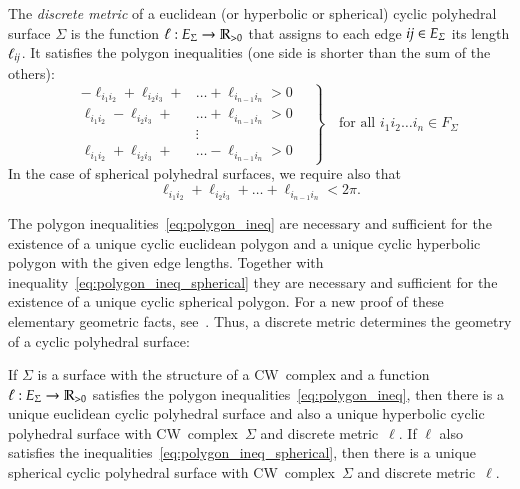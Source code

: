 \documentclass[Thesis]{subfiles}
\begin{document}
The \emph{discrete metric} of a euclidean (or hyperbolic or spherical) cyclic polyhedral surface $\Sigma$ is the function $\ell:E_{\Sigma}\rightarrow\mathbb R_{>0}$ that assigns to each edge $\it ij \in E_{\Sigma}$ its
length $\ell_{\it ij}$. 
It satisfies the polygon inequalities (one side is shorter than the sum of the others):
\begin{equation}
\label{eq:polygon_ineq}
\left.
\quad
\begin{aligned}
-\ell_{i_{1}i_{2}}+\ell_{i_{2}i_{3}}+&\ldots+\ell_{i_{n-1}i_{n}}
>0\\
\ell_{i_{1}i_{2}}-\ell_{i_{2}i_{3}}+&\ldots+\ell_{i_{n-1}i_{n}}
>0\\
&\vdots\\
\ell_{i_{1}i_{2}}+\ell_{i_{2}i_{3}}+&\ldots-\ell_{i_{n-1}i_{n}}
>0
\end{aligned}
\quad
\right\}
\quad
\text{for all $i_{1}i_{2}\ldots i_{n}\in F_{\Sigma}$}
\end{equation}
In the case of spherical polyhedral surfaces, we require also that
\begin{equation}
  \label{eq:polygon_ineq_spherical}
  \ell_{i_{1}i_{2}}+\ell_{i_{2}i_{3}}+\ldots+\ell_{i_{n-1}i_{n}}
<2\pi.
\end{equation}

The polygon inequalities~\eqref{eq:polygon_ineq} are necessary and
sufficient for the existence of a unique cyclic euclidean polygon and
a unique cyclic hyperbolic polygon with the given edge
lengths. Together with inequality~\eqref{eq:polygon_ineq_spherical}
they are necessary and sufficient for the existence of a unique cyclic
spherical polygon. For a new proof of these elementary geometric
facts, see~\cite{KSS15}. Thus, a discrete metric determines the geometry of
a cyclic polyhedral surface:

If $\Sigma$ is a surface with the structure of a CW~complex and a function $\ell:E_{\Sigma}\rightarrow\mathbb R_{>0}$ satisfies the polygon inequalities~\eqref{eq:polygon_ineq}, then there is a unique euclidean
cyclic polyhedral surface and also a unique hyperbolic cyclic
polyhedral surface with CW~complex~$\Sigma$ and discrete
metric~$\ell$. If $\ell$ also satisfies the
inequalities~\eqref{eq:polygon_ineq_spherical}, then there is a unique spherical
cyclic polyhedral surface with CW~complex~$\Sigma$ and discrete
metric~$\ell$.

\end{document}
